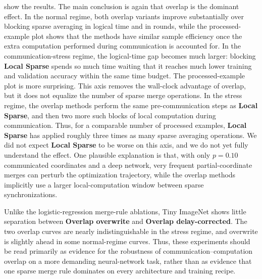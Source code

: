 \documentclass{article}
\theoremstyle{plain}
\theoremstyle{definition}
\begin{document}
 show the results.
The main conclusion is again that overlap is the dominant effect.
In the normal regime, both overlap variants improve substantially over blocking sparse averaging in logical time and in rounds, while the processed-example plot shows that the methods have similar sample efficiency once the extra computation performed during communication is accounted for.
In the communication-stress regime, the logical-time gap becomes much larger: blocking \textbf{Local Sparse} spends so much time waiting that it reaches much lower training and validation accuracy within the same time budget.
The processed-example plot is more surprising.
This axis removes the wall-clock advantage of overlap, but it does not equalize the number of sparse merge operations.
In the stress regime, the overlap methods perform the same pre-communication steps as \textbf{Local Sparse}, and then two more such blocks of local computation during communication.
Thus, for a comparable number of processed examples, \textbf{Local Sparse} has applied roughly three times as many sparse averaging operations.
We did not expect \textbf{Local Sparse} to be worse on this axis, and we do not yet fully understand the effect.
One plausible explanation is that, with only \(p=0.10\) communicated coordinates and a deep network, very frequent partial-coordinate merges can perturb the optimization trajectory, while the overlap methods implicitly use a larger local-computation window between sparse synchronizations.

Unlike the logistic-regression merge-rule ablations, Tiny ImageNet shows little separation between \textbf{Overlap overwrite} and \textbf{Overlap delay-corrected}.
The two overlap curves are nearly indistinguishable in the stress regime, and overwrite is slightly ahead in some normal-regime curves.
Thus, these experiments should be read primarily as evidence for the robustness of communication--computation overlap on a more demanding neural-network task, rather than as evidence that one sparse merge rule dominates on every architecture and training recipe.
\end{document}
